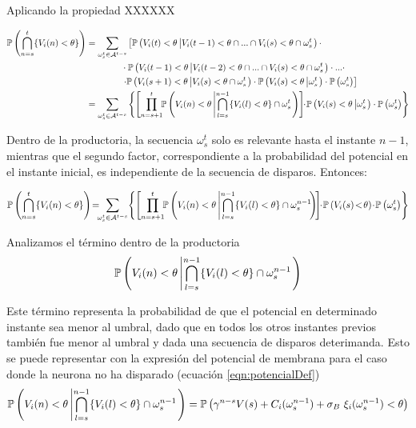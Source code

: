 Aplicando la propiedad XXXXXX

\begin{align*}
    \mathbb{P}\left( \bigcap_{n=s}^t \{ V_i(n) < \theta \} \right) & = 
    \sum_{\omega_s^t \in \mathcal{A}^{t-s}} \left[
       \mathbb{P}\left( V_i(t) < \theta \left| V_i(t-1) < \theta \cap... \cap V_i(s) < \theta \cap \omega_s^t \right.\right) \cdot \right.\\
       & \qquad \qquad \cdot \mathbb{P}\left( V_i(t-1) < \theta \left| V_i(t-2) < \theta \cap... \cap V_i(s) < \theta \cap \omega_s^t  \right.\right) \cdot ... \cdot \\
       & \left. \qquad \qquad \cdot \mathbb{P}\left( V_i(s+1) < \theta \left| V_i(s) < \theta \cap \omega_s^t \right.\right) \cdot \mathbb{P}\left( V_i(s) < \theta \left| \omega_s^t \right.\right) \cdot \mathbb{P}\left(\omega_s^t\right) \right] \\
       &= \sum_{\omega_s^t \in \mathcal{A}^{t-s}} \left\{ \left[ \prod_{n=s+1}^t \!\!
       \mathbb{P}\left( V_i(n) < \theta \left|  \bigcap_{l=s}^{n-1} \{ V_i(l) < \theta \} \cap \omega_s^t \right.\right) \right]\!\! \cdot \!\mathbb{P}\left( V_i(s) < \theta \left| \omega_s^t \right. \right) \cdot \mathbb{P}\left(\omega_s^t\right) \right\}
\end{align*}

Dentro de la productoria, la secuencia $\omega_s^t$ solo es relevante hasta el instante $n-1$, mientras que el segundo factor, correspondiente a la probabilidad del potencial en el instante inicial, es independiente de la secuencia de disparos. Entonces:

\begin{equation}
    \prob{ \bigcap_{n=s}^t \{ V_i(n) < \theta \} } \! = \!\!\!
    \sum_{\omega_s^t \in \mathcal{A}^{t-s}} \! \left\{ \left[ \prod_{n=s+1}^t  \!\!
      \prob{ V_i(n) < \theta \left|  \bigcap_{l=s}^{n-1} \{ V_i(l) < \theta \} \cap \omega_s^{n-1} \! \! \right. } \! \right] \!\! \cdot \! \prob{ V_i(s) \! < \! \theta } \! \cdot\! \prob{\omega_s^t} \right\}
    \label{eqn:probdisparo}
\end{equation}
    
Analizamos el término dentro de la productoria
\begin{equation*}
     \mathbb{P}\left( V_i(n) < \theta \left|  \bigcap_{l=s}^{n-1} \{ V_i(l) < \theta \} \cap \omega_s^{n-1} \right. \right)
\end{equation*}

Este término representa la probabilidad de que el potencial en determinado instante sea menor al umbral, dado que en todos los otros instantes previos también fue menor al umbral y dada una secuencia de disparos deterimanda.
Esto se puede representar con la expresión del potencial de membrana para el caso donde la neurona no ha disparado (ecuación \eqref{eqn:potencialDef})
\begin{equation*}
     \mathbb{P}\left( V_i(n) < \theta \left|  \bigcap_{l=s}^{n-1} \{ V_i(l) < \theta \} \cap \omega_s^{n-1} \right. \right) =
    \mathbb{P}\left( \gamma^{n-s} V(s) + C_i(\omega_s^{n-1}) + \sigma_B \  \xi_i(\omega_s^{n-1}) < \theta \right)
\end{equation*}

